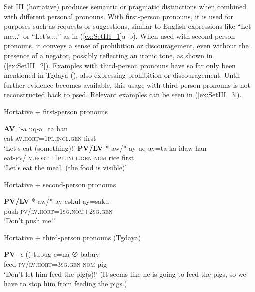 Set III (hortative) produces semantic or pragmatic distinctions when combined with different personal pronouns. With first-person pronouns, it is used for purposes such as requests or suggestions, similar to English expressions like ``Let me...'' or ``Let's...,'' as in (\ref{ex:SetIII_1}a--b). When used with second-person pronouns, it conveys a sense of prohibition or discouragement, even without the presence of a negator, possibly reflecting an ironic tone, as shown in (\ref{ex:SetIII_2}). Examples with third-person pronouns have so far only been mentioned in Tgdaya (\cite[97--98]{ochiai2016phd}), also expressing prohibition or discouragement. Until further evidence becomes available, this usage with third-person pronouns is not reconstructed back to \acl{psed}. Relevant examples can be seen in (\ref{ex:SetIII_3}).


\begin{exe}
\ex Hortative + first-person pronouns \label{ex:SetIII_1}
    \begin{xlist}
    \ex \textbf{AV} *-a
    \gll *uq-a=ta han\\
    eat-\textsc{av.hort}=\textsc{1pl.incl.gen} first\\
    \glt `Let's eat (something)!'
    \ex \textbf{PV/LV} *-aw/*-ay
    \gll *uq-ay=ta ka idaw han\\
    eat-\textsc{pv/lv.hort}=\textsc{1pl.incl.gen} \textsc{nom} rice first\\
    \glt `Let's eat the meal. (the food is visible)'
    \end{xlist}
\ex Hortative + second-person pronouns \label{ex:SetIII_2}
    \begin{xlist}
    \ex \textbf{PV/LV} *-aw/*-ay
    \gll *cəkul-ay=saku\\
    push-\textsc{pv/lv.hort}=\textsc{1sg.nom+2sg.gen}\\
    \glt `Don't push me!'
    \end{xlist}
\end{exe}


\begin{exe}
\ex Hortative + third-person pronouns (Tgdaya) \label{ex:SetIII_3}
    \begin{xlist}
    \ex \textbf{PV} -\textit{e} (\cite[98]{ochiai2016phd})
    \gll tubug-e=na ∅ babuy\\
    feed-\textsc{pv/lv.hort}=\textsc{3sg.gen} \textsc{nom} pig\\
    \glt `Don't let him feed the pig(s)!' (It seems like he is going to feed the pigs, so we have to stop him from feeding the pigs.)
    \end{xlist}
\end{exe}


